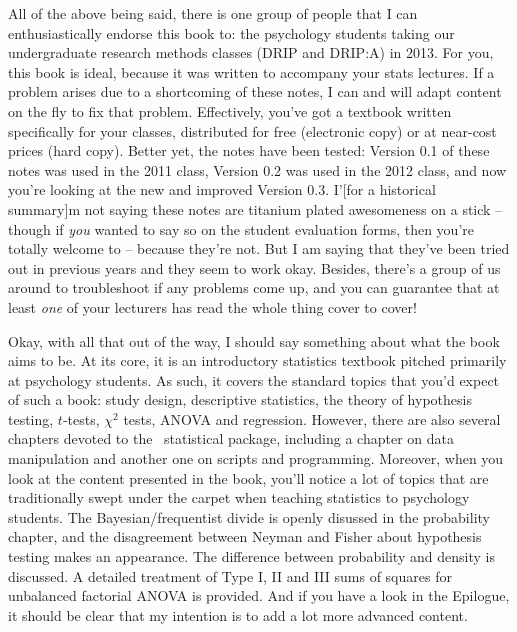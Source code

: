 All of the above being said, there is one group of people that I can enthusiastically endorse this book to: the psychology students taking our undergraduate research methods classes (DRIP and DRIP:A) in 2013. For you, this book is ideal, because it was written to accompany your stats lectures. If a problem arises due to a shortcoming of these notes, I can and will adapt content on the fly to fix that problem. Effectively, you've got a textbook written specifically for your classes, distributed for free (electronic copy) or at near-cost prices (hard copy). Better yet, the notes have been tested: Version 0.1 of these notes was used in the 2011 class, Version 0.2 was used in the 2012 class, and now you're looking at the new and improved Version 0.3. I'[for a historical summary]m not saying these notes are titanium plated awesomeness on a stick -- though if {\it you} wanted to say so on the student evaluation forms, then you're totally welcome to -- because they're not. But I am saying that they've been tried out in previous years and they seem to work okay. Besides, there's a group of us around to troubleshoot if any problems come up, and you can guarantee that at least {\it one} of your lecturers has read the whole thing cover to cover! \vsp

Okay, with all that out of the way, I should say something about what the book aims to be. At its core, it is an introductory statistics textbook pitched primarily at psychology students. As such, it covers the standard topics that you'd expect of such a book: study design, descriptive statistics, the theory of hypothesis testing, $t$-tests, $\chi^2$ tests, ANOVA and regression. However, there are also several chapters devoted to the \R\ statistical package, including a chapter on data manipulation and another one on scripts and programming. Moreover, when you look at the content presented in the book, you'll notice a lot of topics that are traditionally swept under the carpet when teaching statistics to psychology students. The Bayesian/frequentist divide is openly disussed in the probability chapter, and the disagreement between Neyman and Fisher about hypothesis testing makes an appearance. The difference between probability and density is discussed. A detailed treatment of Type I, II and III sums of squares for unbalanced factorial ANOVA is provided. And if you have a look in the Epilogue, it should be clear that my intention is to add a lot more advanced content.\vsp

